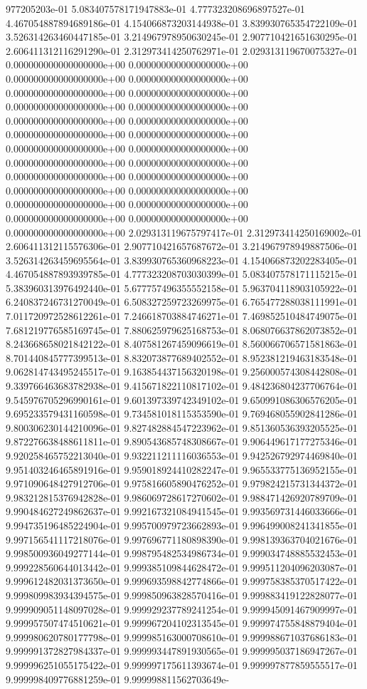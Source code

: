 977205203e-01	5.083407578171947883e-01	4.777323208696897527e-01	4.467054887894689186e-01	4.154066873203144938e-01	3.839930765354722109e-01	3.526314263460447185e-01	3.214967978950630245e-01	2.907710421651630295e-01	2.606411312116291290e-01	2.312973414250762971e-01	2.029313119670075327e-01	0.000000000000000000e+00	0.000000000000000000e+00	0.000000000000000000e+00	0.000000000000000000e+00	0.000000000000000000e+00	0.000000000000000000e+00	0.000000000000000000e+00	0.000000000000000000e+00	0.000000000000000000e+00	0.000000000000000000e+00	0.000000000000000000e+00	0.000000000000000000e+00	0.000000000000000000e+00	0.000000000000000000e+00	0.000000000000000000e+00	0.000000000000000000e+00	0.000000000000000000e+00	0.000000000000000000e+00	0.000000000000000000e+00	0.000000000000000000e+00	0.000000000000000000e+00	0.000000000000000000e+00	0.000000000000000000e+00	0.000000000000000000e+00	0.000000000000000000e+00	2.029313119675797417e-01	2.312973414250169002e-01	2.606411312115576306e-01	2.907710421657687672e-01	3.214967978949887506e-01	3.526314263459695564e-01	3.839930765360968223e-01	4.154066873202283405e-01	4.467054887893939785e-01	4.777323208703030399e-01	5.083407578171115215e-01	5.383960313976492440e-01	5.677757496355552158e-01	5.963704118903105922e-01	6.240837246731270049e-01	6.508327259723269975e-01	6.765477288038111991e-01	7.011720972528612261e-01	7.246618703884746271e-01	7.469852510484749075e-01	7.681219776585169745e-01	7.880625979625168753e-01	8.068076637862073852e-01	8.243668658021842122e-01	8.407581267459096619e-01	8.560066706571581863e-01	8.701440845777399513e-01	8.832073877689402552e-01	8.952381219463183548e-01	9.062814743495245517e-01	9.163854437156320198e-01	9.256000574308442808e-01	9.339766463683782938e-01	9.415671822110817102e-01	9.484236804237706764e-01	9.545976705296990161e-01	9.601397339742349102e-01	9.650991086306576205e-01	9.695233579431160598e-01	9.734581018115353590e-01	9.769468055902841286e-01	9.800306230144210096e-01	9.827482884547223962e-01	9.851360536393205525e-01	9.872276638488611811e-01	9.890543685748308667e-01	9.906449617177275346e-01	9.920258465752213040e-01	9.932211211116036553e-01	9.942526792974469840e-01	9.951403246465891916e-01	9.959018924410282247e-01	9.965533775136952155e-01	9.971090648427912706e-01	9.975816605890476252e-01	9.979824215731344372e-01	9.983212815376942828e-01	9.986069728617270602e-01	9.988471426920789709e-01	9.990484627249862637e-01	9.992167321084941545e-01	9.993569731446033666e-01	9.994735196485224904e-01	9.995700979723662893e-01	9.996499008241341855e-01	9.997156541117218076e-01	9.997696771180898390e-01	9.998139363704021676e-01	9.998500936049277144e-01	9.998795482534986734e-01	9.999034748885532453e-01	9.999228560644013442e-01	9.999385109844628472e-01	9.999511204096203087e-01	9.999612482031373650e-01	9.999693598842774866e-01	9.999758385370517422e-01	9.999809983934394575e-01	9.999850963828570416e-01	9.999883419122828077e-01	9.999909051148097028e-01	9.999929237789241254e-01	9.999945091467909997e-01	9.999957507474510621e-01	9.999967204102313545e-01	9.999974755848879404e-01	9.999980620780177798e-01	9.999985163000708610e-01	9.999988671037686183e-01	9.999991372827984337e-01	9.999993447891930565e-01	9.999995037186947267e-01	9.999996251055175422e-01	9.999997175611393674e-01	9.999997877859555517e-01	9.999998409776881259e-01	9.999998811562703649e-